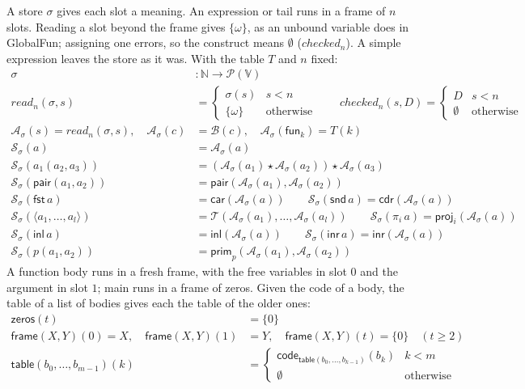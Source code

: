 \documentclass[10pt]{article}
\theoremstyle{acmplain}
\newcommand{\key}[1]{\mathsf{#1}}
\newcommand{\inl}{\key{inl}\,}
\newcommand{\inr}{\key{inr}\,}
\newcommand{\tuple}[1]{\langle #1 \rangle}
\newcommand{\prj}[1]{\pi_{#1}\,}
\newcommand{\funref}[1]{\key{fun}_{#1}}
\newcommand{\pair}[2]{\key{pair}(#1, #2)}
\newcommand{\FST}{\key{fst}\,}
\newcommand{\SND}{\key{snd}\,}
\newcommand{\SET}[1]{\mathcal{P}(#1)}
\newcommand{\V}{\mathbb{V}}
\newcommand{\prim}[3]{#1(#2, #3)}
\newcommand{\app}{\star}
\begin{document}
A store $\sigma$ gives each slot a meaning. An expression or tail runs in
a frame of $n$ slots. Reading a slot beyond the frame gives $\{\omega\}$,
as an unbound variable does in GlobalFun; assigning one errors, so the
construct means $\emptyset$ ($\mathit{checked}_n$). A simple expression
leaves the store as it was. With the table $T$ and $n$ fixed:
\begin{align*}
  \sigma &: \mathbb{N} \to \SET{\V} \\
  \mathit{read}_n(\sigma, s) &=
    \begin{cases} \sigma(s) & s < n \\ \{\omega\} & \text{otherwise} \end{cases} \qquad
  \mathit{checked}_n(s, D) =
    \begin{cases} D & s < n \\ \emptyset & \text{otherwise} \end{cases} \\[1ex]
  \mathcal{A}_\sigma(s) = \mathit{read}_n(\sigma, s), \quad
  \mathcal{A}_\sigma(c) &= \mathcal{B}(c), \quad
  \mathcal{A}_\sigma(\funref{k}) = T(k) \\[1ex]
  \mathcal{S}_\sigma(a) &= \mathcal{A}_\sigma(a) \\
  \mathcal{S}_\sigma(a_1(a_2, a_3)) &= (\mathcal{A}_\sigma(a_1) \app \mathcal{A}_\sigma(a_2)) \app \mathcal{A}_\sigma(a_3) \\
  \mathcal{S}_\sigma(\pair{a_1}{a_2}) &= \key{pair}(\mathcal{A}_\sigma(a_1), \mathcal{A}_\sigma(a_2)) \\
  \mathcal{S}_\sigma(\FST a) &= \key{car}(\mathcal{A}_\sigma(a)) \qquad
  \mathcal{S}_\sigma(\SND a) = \key{cdr}(\mathcal{A}_\sigma(a)) \\
  \mathcal{S}_\sigma(\tuple{a_1, \ldots, a_l}) &= \mathcal{T}(\mathcal{A}_\sigma(a_1), \ldots, \mathcal{A}_\sigma(a_l)) \qquad
  \mathcal{S}_\sigma(\prj{i} a) = \key{proj}_i(\mathcal{A}_\sigma(a)) \\
  \mathcal{S}_\sigma(\inl a) &= \key{inl}(\mathcal{A}_\sigma(a)) \qquad
  \mathcal{S}_\sigma(\inr a) = \key{inr}(\mathcal{A}_\sigma(a)) \\
  \mathcal{S}_\sigma(\prim{p}{a_1}{a_2}) &= \key{prim}_p(\mathcal{A}_\sigma(a_1), \mathcal{A}_\sigma(a_2))
\end{align*}
A function body runs in a fresh frame, with the free variables in slot
$0$ and the argument in slot $1$; main runs in a frame of zeros. Given
the code of a body, the table of a list of bodies gives each the table
of the older ones:
\begin{align*}
  \key{zeros}(t) &= \{0\} \\
  \key{frame}(X, Y)(0) = X, \quad \key{frame}(X, Y)(1) &= Y, \quad
  \key{frame}(X, Y)(t) = \{0\} \quad (t \geq 2) \\[1ex]
  \key{table}(b_0,\ldots,b_{m-1})(k) &=
    \begin{cases}
      \key{code}_{\key{table}(b_0,\ldots,b_{k-1})}(b_k) & k < m \\
      \emptyset & \text{otherwise}
    \end{cases}
\end{align*}
\end{document}
